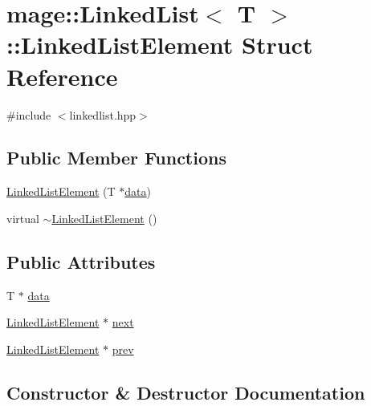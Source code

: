 \hypertarget{structmage_1_1_linked_list_1_1_linked_list_element}{}\section{mage\+:\+:Linked\+List$<$ T $>$\+:\+:Linked\+List\+Element Struct Reference}
\label{structmage_1_1_linked_list_1_1_linked_list_element}


{\ttfamily \#include $<$linkedlist.\+hpp$>$}

\subsection*{Public Member Functions}
\begin{DoxyCompactItemize}
\item 
\hyperlink{structmage_1_1_linked_list_1_1_linked_list_element_a7bb2d9bd1aef7790f675a09a607f4160}{Linked\+List\+Element} (T $\ast$\hyperlink{structmage_1_1_linked_list_1_1_linked_list_element_a7db014fd56a2bffd6dab7f52f1b30687}{data})
\item 
virtual \hyperlink{structmage_1_1_linked_list_1_1_linked_list_element_a89ff38c90ddf8854abb821d1497e8e1c}{$\sim$\+Linked\+List\+Element} ()
\end{DoxyCompactItemize}
\subsection*{Public Attributes}
\begin{DoxyCompactItemize}
\item 
T $\ast$ \hyperlink{structmage_1_1_linked_list_1_1_linked_list_element_a7db014fd56a2bffd6dab7f52f1b30687}{data}
\item 
\hyperlink{structmage_1_1_linked_list_1_1_linked_list_element}{Linked\+List\+Element} $\ast$ \hyperlink{structmage_1_1_linked_list_1_1_linked_list_element_a379ce1f54d7a044cdfd97595460ac602}{next}
\item 
\hyperlink{structmage_1_1_linked_list_1_1_linked_list_element}{Linked\+List\+Element} $\ast$ \hyperlink{structmage_1_1_linked_list_1_1_linked_list_element_a6aa1a290fa0c06efae90730220bb4c57}{prev}
\end{DoxyCompactItemize}


\subsection{Constructor \& Destructor Documentation}
\hypertarget{structmage_1_1_linked_list_1_1_linked_list_element_a7bb2d9bd1aef7790f675a09a607f4160}{}\label{structmage_1_1_linked_list_1_1_linked_list_element_a7bb2d9bd1aef7790f675a09a607f4160} 

